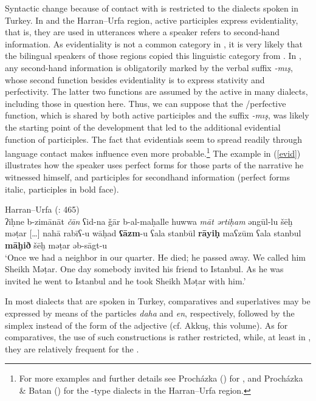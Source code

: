 \documentclass[output=paper]{langsci/langscibook}
\begin{document}
Syntactic change because of contact with  is restricted to the  dialects spoken in Turkey. In  and the Harran--Urfa region, active participles express evidentiality, that is, they are used in utterances where a speaker refers to second-hand information. As evidentiality is not a common category in , it is very likely that the bilingual  speakers of those regions copied this linguistic category from . In , any second-hand information is obligatorily marked by the verbal suffix \textit{-mış}, whose second function besides evidentiality is to express stativity and perfectivity. The latter two functions are assumed by the active  in many  dialects, including those in question here. Thus, we can suppose that the /perfective function, which is shared by both  active participles and the  suffix \textit{-mış}, was likely the starting point of the development that led to the additional evidential function of  participles. The fact that evidentials seem to spread readily through language contact \citep[10]{Aikhenvald2004} makes  influence even more probable.\footnote{For more examples and further details see Procházka (\citeyear[200--201]{Procházka2002Cukurova}) for , and Procházka \& Batan (\citeyear[464--465]{ProcházkaBatan2016}) for the -type dialects in the Harran--Urfa region.} The example in (\ref{evid}) illustrates how the speaker uses perfect forms for those parts of the narrative he witnessed himself, and participles for secondhand information (perfect forms italic, participles in bold face). 

\ea \label{evid}
{Harran--Urfa (\citealt{ProcházkaBatan2016}: 465)}\\
  ʔiḥne b-zimānāt \textit{čān} ʕid-na ǧār b-al-maḥalle huwwa \textit{māt} \textit{ərtiḥam} əngūl-lu šēḫ mǝṭar […] nahā{\R} rabīʕ-u wāḥad  \textbf{ʕāzm}{}-u ʕala stanbūl \textbf{rāyiḥ} maʕzūm ʕala stanbul \textbf{māḫið} šēḫ mǝṭar əb-sāgt-u\\

\glt ‘Once we had a neighbor in our quarter. He died; he passed away. We called him Sheikh Mǝṭar. One day somebody invited his friend to Istanbul. As he was invited he went to Istanbul and he took Sheikh Mǝṭar with him.’
\z

In most  dialects that are spoken in Turkey, comparatives and superlatives may be expressed by means of the  particles \textit{daha} and \textit{en}, respectively, followed by the simplex instead of the  form of the adjective (cf. Akkuş, this volume). As for comparatives, the use of such constructions is rather restricted, while, at least in  , they are relatively frequent for the . 
\end{document}
